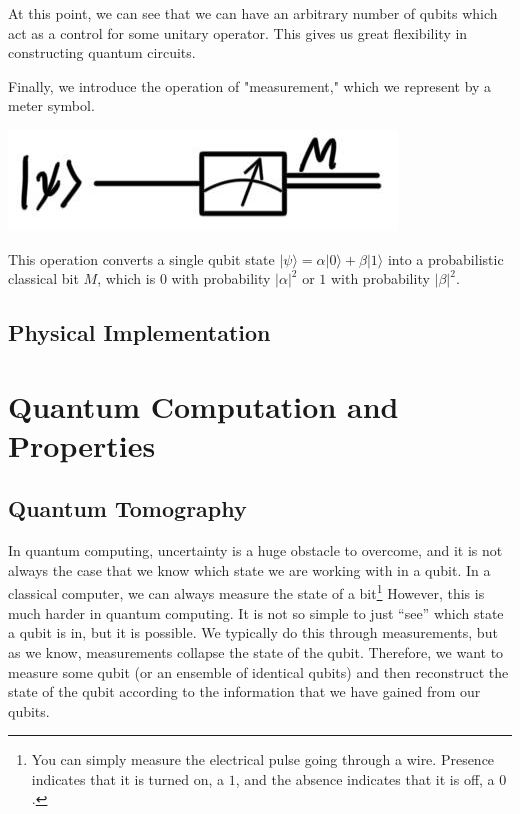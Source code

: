 \documentclass{article}
\begin{document}
    At this point, we can see that we can have an arbitrary number of qubits which act as a control for some unitary operator. This gives us great flexibility in constructing quantum circuits.

    \begin{definition}[Measurement]
      Finally, we introduce the operation of "measurement," which we represent by a meter symbol.
      \begin{center}
        \includegraphics[scale=0.3]{img/Measurement_gate.jpg}
      \end{center}
      This operation converts a single qubit state $| \psi \rangle = \alpha |0\rangle + \beta |1\rangle$ into a probabilistic classical bit $M$, which is $0$ with probability $|\alpha|^2$ or $1$ with probability $|\beta|^2$. 
    \end{definition}

  \subsection{Physical Implementation} 

\section{Quantum Computation and Properties}

  \subsection{Quantum Tomography}

    In quantum computing, uncertainty is a huge obstacle to overcome, and it is not always the case that we know which state we are working with in a qubit. In a classical computer, we can always measure the state of a bit\footnote{You can simply measure the electrical pulse going through a wire. Presence indicates that it is turned on, a $1$, and the absence indicates that it is off, a $0$. } However, this is much harder in quantum computing. It is not so simple to just ``see'' which state a qubit is in, but it is possible. We typically do this through measurements, but as we know, measurements collapse the state of the qubit. Therefore, we want to measure some qubit (or an ensemble of identical qubits) and then reconstruct the state of the qubit according to the information that we have gained from our qubits. 
\end{document}
